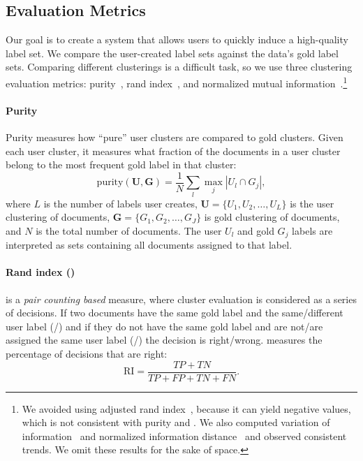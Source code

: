  
 

\subsection{Evaluation Metrics}
\label{sub:eval}


 
    Our goal is to create a system that allows users
to quickly induce a high-quality label set.  We compare the
user-created label sets against the data's gold label sets.  Comparing
different clusterings is a difficult task, so we use three clustering
evaluation metrics: purity~\cite{purity}, rand
index~\cite[]{rand1971objective}, and normalized mutual
information~\cite[]{strehl2003cluster}.\footnote{We avoided using adjusted rand index~\cite{hubert1985comparing}, because it can yield negative values, which is not consistent with purity and . We also computed
  variation of information~\cite{meilua2003comparing} and normalized
  information distance~\cite{vitanyi2009normalized} and observed consistent trends. We omit these results for the sake of space.}

\paragraph{Purity}

Purity measures how ``pure'' user clusters are compared to gold
clusters. Given each user cluster, it measures what fraction of the documents in a user
cluster belong to the most frequent gold label in that cluster:
\begin{equation}
\label{eq:purity}
\mbox{purity}(\mathbf{U},\mathbf{G}) = \frac{1}{N}\sum\limits_{l} \max\limits_{j}|U_l \cap G_j|,
\end{equation}
where $L$ is the number of labels user creates, $\mathbf{U} = \{U_1,
U_2, \dots,U_L\}$ is the user clustering of documents, $\mathbf{G} =
\{G_1, G_2, \dots, G_J\}$ is gold clustering of documents, and $N$ is
the total number of documents. The user $U_l$ and gold $G_j$ labels
are interpreted as sets containing all documents assigned to that label.

\paragraph{Rand index ()}

 is a \emph{pair counting based} measure, where cluster
evaluation is considered as a series of decisions. If two documents
have the same gold label and the same/different user label (/) and if
they do not have the same gold label and are not/are assigned the same user
label (/) the decision is right/wrong.  measures the
percentage of decisions that are right:
\begin{equation}
\label{eq:ri}
\mbox{RI} = \frac{TP+TN}{TP+FP+TN+FN}.
\end{equation}

